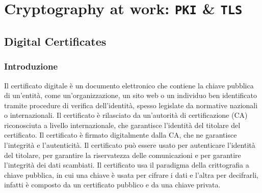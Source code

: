 \chapter[\texttt{PKI} \& \texttt{TLS}]{Cryptography at work: \texttt{PKI} \& \texttt{TLS}}
\thispagestyle{chapterInit}
\section{Digital Certificates}
    \subsection{Introduzione}
        Il certificato digitale è un documento elettronico che contiene la chiave pubblica di un'entità, come un'organizzazione, un sito web o un individuo ben identificato tramite procedure di verifica dell'identità, spesso legislate da normative nazionali o internazionali. Il certificato è rilasciato da un'autorità di certificazione (CA) riconosciuta a livello internazionale, che garantisce l'identità del titolare del certificato. Il certificato è firmato digitalmente dalla CA, che ne garantisce l'integrità e l'autenticità. Il certificato può essere usato per autenticare l'identità del titolare, per garantire la riservatezza delle comunicazioni e per garantire l'integrità dei dati scambiati.
        Il certificato usa il paradigma della crittografia a chiave pubblica, in cui una chiave è usata per cifrare i dati e l'altra per decifrarli, infatti è composto da un certificato pubblico e da una chiave privata.
